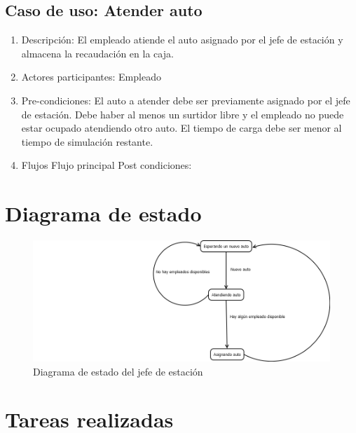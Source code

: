 \documentclass[12pt,a4paper,titlepage,oneside]{article}
\begin{document}
\subsection{Caso de uso: Atender auto}
\begin{enumerate}
\item Descripción: El empleado atiende el auto asignado por el jefe de estación y almacena la recaudación en la caja.
\item Actores participantes: Empleado
\item Pre-condiciones: El auto a atender debe ser previamente asignado por el jefe de estación. Debe haber al menos un surtidor libre y el empleado no puede estar ocupado atendiendo otro auto. El tiempo de carga debe ser menor al tiempo de simulación restante.
\item Flujos
Flujo principal
Post condiciones: 
\end{enumerate}




\section{Diagrama de estado}



\begin{figure}
\begin{center}
\includegraphics[scale=0.5]{diagrama_estado_jefe.png}
\end{center}
\caption[Long caption]{Diagrama de estado del jefe de estación}
\end{figure}


\section{Tareas realizadas}
\end{document}
